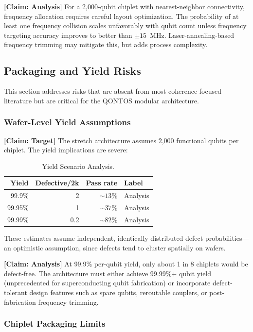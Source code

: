 \documentclass[conference]{IEEEtran}
\begin{document}
\textbf{[Claim: Analysis]} For a 2,000-qubit chiplet with nearest-neighbor connectivity, frequency allocation requires careful layout optimization. The probability of at least one frequency collision scales unfavorably with qubit count unless frequency targeting accuracy improves to better than $\pm 15$~MHz. Laser-annealing-based frequency trimming may mitigate this, but adds process complexity.

\subsection{Packaging and Yield Risks}

This section addresses risks that are absent from most coherence-focused literature but are critical for the QONTOS modular architecture.

\subsubsection{Wafer-Level Yield Assumptions}

\textbf{[Claim: Target]} The stretch architecture assumes 2,000 functional qubits per chiplet. The yield implications are severe:

\begin{table}[htbp]
\centering
\caption{Yield Scenario Analysis.}
\label{tab:yield}
\begin{tabular}{rrrl}
\toprule
\textbf{Yield} & \textbf{Defective/2k} & \textbf{Pass rate} & \textbf{Label} \\
\midrule
99.9\% & 2 & ${\sim}13\%$ & Analysis \\
99.95\% & 1 & ${\sim}37\%$ & Analysis \\
99.99\% & 0.2 & ${\sim}82\%$ & Analysis \\
\bottomrule
\end{tabular}
\end{table}

These estimates assume independent, identically distributed defect probabilities---an optimistic assumption, since defects tend to cluster spatially on wafers.

\textbf{[Claim: Analysis]} At 99.9\% per-qubit yield, only about 1 in 8 chiplets would be defect-free. The architecture must either achieve 99.99\%+ qubit yield (unprecedented for superconducting qubit fabrication) or incorporate defect-tolerant design features such as spare qubits, reroutable couplers, or post-fabrication frequency trimming.

\subsubsection{Chiplet Packaging Limits}
\end{document}
